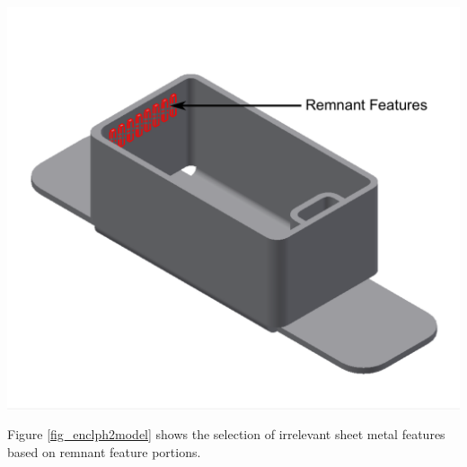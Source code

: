
\begin{minipage}{\linewidth}
\begin{minipage}[c]{0.62\linewidth}
\includegraphics[width=\linewidth,valign=t]{images/SheetMetal_Medium_Enclosure_PhaseIISelections_2}

 \label{fig_enclph2model}

\bigskip

Figure \ref{fig_enclph2model} shows the selection of irrelevant sheet metal features based on remnant feature portions.%


\end{minipage}
\end{minipage}
